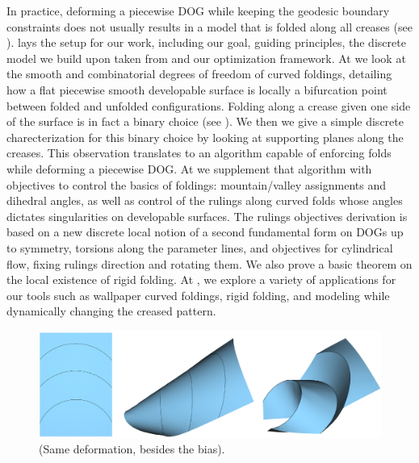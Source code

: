 In practice, deforming a piecewise DOG while keeping the geodesic boundary constraints does not usually results in a model that is folded along all creases (see ).  lays the setup for our work, including our goal, guiding principles, the discrete model we build upon taken from \cite{rabi18,rabi2018shape} and our optimization framework. At  we look at the smooth and combinatorial degrees of freedom of curved foldings, detailing how a flat piecewise smooth developable surface is locally a bifurcation point between folded and unfolded configurations. Folding along a crease given one side of the surface is in fact a binary choice (see ). We then we give a simple discrete charecterization for this binary choice by looking at supporting planes along the creases. This observation translates to an algorithm capable of enforcing folds while deforming a piecewise DOG. At  we supplement that algorithm with objectives to control the basics of foldings: mountain/valley assignments and dihedral angles, as well as control of the rulings along curved folds whose angles dictates singularities on developable surfaces. The rulings objectives derivation is based on a new discrete local notion of a second fundamental form on DOGs up to symmetry, torsions along the parameter lines, and objectives for cylindrical flow, fixing rulings direction and rotating them. We also prove a basic theorem on the local existence of rigid folding. At , we explore a variety of applications for our tools such as wallpaper curved foldings, rigid folding, and modeling while dynamically changing the creased pattern.

\begin{figure} [h]
	\centering
	\includegraphics[width=\linewidth]{figures/folded_and_not_folded}
	\caption{(Same deformation, besides the bias). }
	\label{fig:folded_and_not_folded}
\end{figure}